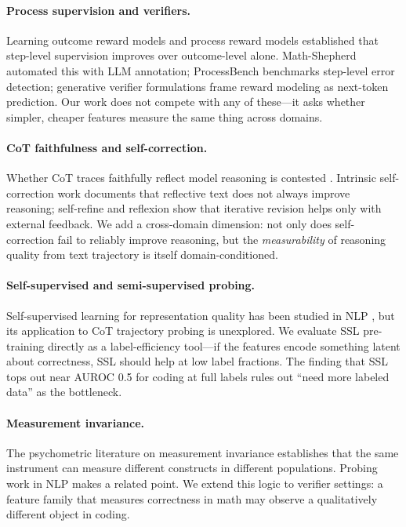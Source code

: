 \documentclass{article}
\begin{document}
\paragraph{Process supervision and verifiers.} Learning outcome reward models \citep{cobbe2021training} and process reward models \citep{lightman2023verify} established that step-level supervision improves over outcome-level alone. Math-Shepherd \citep{wang2024mathshepherd} automated this with LLM annotation; ProcessBench \citep{zheng2025processbench} benchmarks step-level error detection; generative verifier formulations \citep{zhang2025genrm} frame reward modeling as next-token prediction. Our work does not compete with any of these—it asks whether simpler, cheaper features measure the same thing across domains.

\paragraph{CoT faithfulness and self-correction.} Whether CoT traces faithfully reflect model reasoning is contested \citep{lanham2023faithfulness}. Intrinsic self-correction work \citep{huang2024selfcorrect,liu2024intrinsic} documents that reflective text does not always improve reasoning; self-refine \citep{madaan2023selfrefine} and reflexion \citep{shinn2023reflexion} show that iterative revision helps only with external feedback. We add a cross-domain dimension: not only does self-correction fail to reliably improve reasoning, but the \emph{measurability} of reasoning quality from text trajectory is itself domain-conditioned.

\paragraph{Self-supervised and semi-supervised probing.} Self-supervised learning for representation quality has been studied in NLP \citep{devlin2019bert}, but its application to CoT trajectory probing is unexplored. We evaluate SSL pre-training directly as a label-efficiency tool—if the features encode something latent about correctness, SSL should help at low label fractions. The finding that SSL tops out near AUROC 0.5 for coding at full labels rules out ``need more labeled data'' as the bottleneck.

\paragraph{Measurement invariance.} The psychometric literature on measurement invariance \citep{vandenberg2000review} establishes that the same instrument can measure different constructs in different populations. Probing work in NLP \citep{belinkov2022probing} makes a related point. We extend this logic to verifier settings: a feature family that measures correctness in math may observe a qualitatively different object in coding.
\end{document}
